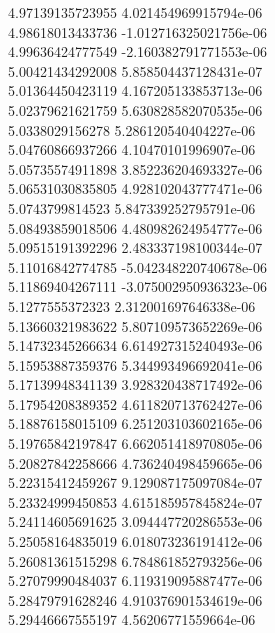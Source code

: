 {4.97139135723955 4.021454969915794e-06 \\
4.98618013433736 -1.012716325021756e-06 \\
4.99636424777549 -2.160382791771553e-06 \\
5.00421434292008 5.858504437128431e-07 \\
5.01364450423119 4.167205133853713e-06 \\
5.02379621621759 5.630828582070535e-06 \\
5.0338029156278 5.286120540404227e-06 \\
5.04760866937266 4.10470101996907e-06 \\
5.05735574911898 3.852236204693327e-06 \\
5.06531030835805 4.928102043777471e-06 \\
5.0743799814523 5.847339252795791e-06 \\
5.08493859018506 4.480982624954777e-06 \\
5.09515191392296 2.483337198100344e-07 \\
5.11016842774785 -5.042348220740678e-06 \\
5.11869404267111 -3.075002950936323e-06 \\
5.1277555372323 2.312001697646338e-06 \\
5.13660321983622 5.807109573652269e-06 \\
5.14732345266634 6.614927315240493e-06 \\
5.15953887359376 5.344993496692041e-06 \\
5.17139948341139 3.928320438717492e-06 \\
5.17954208389352 4.611820713762427e-06 \\
5.18876158015109 6.251203103602165e-06 \\
5.19765842197847 6.662051418970805e-06 \\
5.20827842258666 4.736240498459665e-06 \\
5.22315412459267 9.129087175097084e-07 \\
5.23324999450853 4.615185957845824e-07 \\
5.24114605691625 3.094447720286553e-06 \\
5.25058164835019 6.018073236191412e-06 \\
5.26081361515298 6.784861852793256e-06 \\
5.27079990484037 6.119319095887477e-06 \\
5.28479791628246 4.910376901534619e-06 \\
5.29446667555197 4.56206771559664e-06 \\
}
